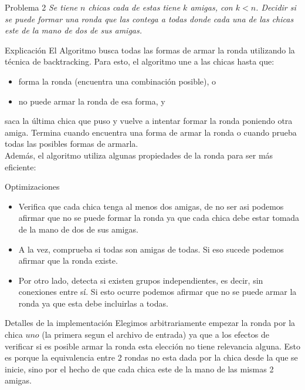 \begin{section}{Problema 2}
	\textit{Se tiene $n$ chicas cada de estas tiene $k$ amigas, con $k<n$. Decidir si se puede formar una ronda que las contega a todas donde cada una de las chicas este de la mano de dos de sus amigas.}
	\begin{subsection}{Explicación}
		El Algoritmo busca todas las formas de armar la ronda utilizando la técnica de backtracking. Para esto, el algoritmo une a las chicas hasta que:
		\begin{itemize} \item forma la ronda (encuentra una combinación posible), o \item no puede armar la ronda de esa forma, y\end{itemize}
		
				saca la última chica que puso y vuelve a intentar formar la ronda poniendo otra amiga. Termina cuando encuentra una forma de armar la ronda o cuando prueba todas las posibles formas de armarla.\\
			
		Además, el algoritmo utiliza algunas propiedades de la ronda para ser más eficiente:
		\begin{subsubsection}{Optimizaciones}
		\begin{itemize} \item Verifica que cada chica tenga al menos dos amigas, de no ser asi podemos afirmar que no se puede formar la ronda ya que cada chica debe estar tomada de la mano de dos de sus amigas.
				\item A la vez, comprueba si todas son amigas de todas. Si eso sucede podemos afirmar que la ronda existe.
				\item Por otro lado, detecta si existen grupos independientes, es decir, sin conexiones entre sí. Si esto ocurre podemos afirmar que no se puede armar la ronda ya que esta debe incluirlas a todas. 
		\end{itemize}
			
		\end{subsubsection}
	\end{subsection}
	\begin{subsection}{Detalles de la implementación}
		Elegimos arbitrariamente empezar la ronda por la chica $uno$ (la primera segun el archivo de entrada) ya que a los efectos de verificar si es posible armar la ronda esta elección no tiene relevancia alguna. Esto es porque la equivalencia entre 2 rondas no esta dada por la chica desde la que se inicie, sino por el hecho de que cada chica este de la mano de las mismas 2 amigas.\\\\
	

\end{subsection}
\end{section}
